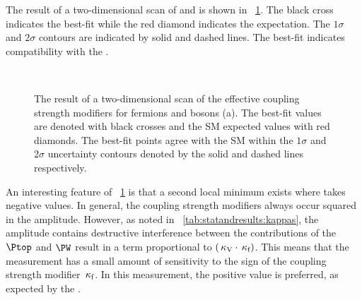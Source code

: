 The result of a two-dimensional \DNLL scan of \kf and \kV is shown in \Fig~\ref{fig:statandresults:kappa_plots_kvkf}. The black cross indicates the best-fit while the red diamond indicates the \SM expectation. The $1\sigma$ and $2\sigma$ contours are indicated by solid and dashed lines. The best-fit indicates compatibility with the \SM. 
\begin{figure}[ht!]
\centering
{}\\
\caption{The result of a two-dimensional \DNLL scan of the effective coupling strength modifiers for fermions and bosons (a). The best-fit values are denoted with black crosses and the SM expected values with red diamonds. The best-fit points agree with the SM within the $1\sigma$ and $2\sigma$ uncertainty contours denoted by the solid and dashed lines respectively.}
\label{fig:statandresults:kappa_plots_kvkf}
\end{figure}

An interesting feature of \Fig~\ref{fig:statandresults:kappa_plots_kvkf} is that a second local minimum exists where \kf takes negative values. In general, the coupling strength modifiers always occur squared in the amplitude. However, as noted in \Table~\ref{tab:statandresults:kappas}, the \Hgg amplitude contains destructive interference between the contributions of the $\Ptop$ and $\PW$ result in a term proportional to $(\,\kappa_\text{V}\cdot\,\kappa_\text{f})$. This means that the measurement has a small amount of sensitivity to the sign of the coupling strength modifier $\,\kappa_\text{f}$. In this measurement, the positive value is preferred, as expected by the \SM. 

%

